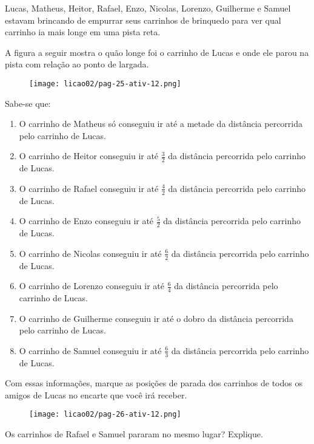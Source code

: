 \begin{atividade}{}\label{chap2-ativ11}

Lucas, Matheus, Heitor, Rafael, Enzo, Nicolas, Lorenzo, Guilherme e Samuel estavam brincando de empurrar seus carrinhos de brinquedo para ver qual carrinho ia mais longe em uma pista reta.

A figura a seguir mostra o quão longe foi o carrinho de Lucas e onde ele parou na pista com relação ao ponto de largada.

\begin{figure}[H]
\centering

\texttt{[image: licao02/pag-25-ativ-12.png]}
\end{figure}

Sabe-se que:

\begin{enumerate}[itemsep=.3em, topsep=.5\parskip]  %
  \item     O carrinho de Matheus só conseguiu ir até a metade da distância percorrida pelo carrinho de Lucas.
  \item     O carrinho de Heitor conseguiu ir até     $\frac{3}{2}$     da distância percorrida pelo carrinho de Lucas.
  \item     O carrinho de Rafael conseguiu ir até     $\frac{4}{2}$     da distância percorrida pelo carrinho de Lucas.
  \item     O carrinho de Enzo conseguiu ir até     $\frac{5}{2}$     da distância percorrida pelo carrinho de Lucas.
  \item     O carrinho de Nicolas conseguiu ir até     $\frac{6}{2}$     da distância percorrida pelo carrinho de Lucas.
  \item     O carrinho de Lorenzo conseguiu ir até     $\frac{6}{4}$     da distância percorrida pelo carrinho de Lucas.
  \item     O carrinho de Guilherme conseguiu ir até o dobro da distância percorrida pelo carrinho de Lucas.
  \item     O carrinho de Samuel conseguiu ir até     $\frac{6}{3}$     da distância percorrida pelo carrinho de Lucas.
\end{enumerate} %


Com essas informações, marque as posições de parada dos carrinhos de todos os amigos de Lucas no encarte que você irá receber.

\begin{figure}[H]
\centering

\texttt{[image: licao02/pag-26-ativ-12.png]}
\end{figure}


Os carrinhos de Rafael e Samuel pararam no mesmo lugar? Explique.
\end{atividade}

